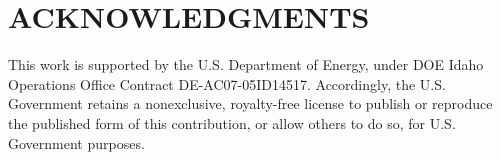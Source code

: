 \documentclass{mc2013}
\begin{document}
\section*{ACKNOWLEDGMENTS}
This work is supported by the U.S. Department of Energy, under DOE Idaho Operations Office Contract DE-AC07-05ID14517. Accordingly, the U.S. Government retains a nonexclusive, royalty-free license to publish or reproduce the published form of this contribution, or allow others to do so, for U.S. Government purposes.



\end{document}
